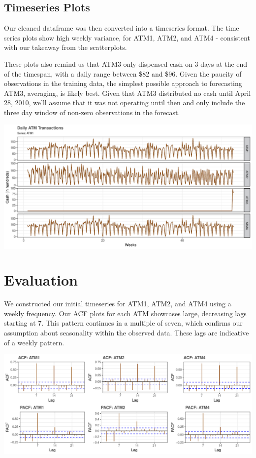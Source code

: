\documentclass[openany]{book}
\begin{document}
\hypertarget{timeseries-plots}{%
\subsection{Timeseries Plots}\label{timeseries-plots}}

Our cleaned dataframe was then converted into a timeseries format. The
time series plots show high weekly variance, for ATM1, ATM2, and ATM4 -
consistent with our takeaway from the scatterplots.

These plots also remind us that ATM3 only dispensed cash on 3 days at
the end of the timespan, with a daily range between \$82 and \$96. Given
the paucity of observations in the training data, the simplest possible
approach to forecasting ATM3, averaging, is likely best. Given that ATM3
distributed no cash until April 28, 2010, we'll assume that it was not
operating until then and only include the three day window of non-zero
observations in the forecast.

\includegraphics{Group2_Project1_Fall2019_files/figure-latex/unnamed-chunk-4-1.pdf}

\hypertarget{evaluation}{%
\section{Evaluation}\label{evaluation}}

We constructed our initial timeseries for ATM1, ATM2, and ATM4 using a
weekly frequency. Our ACF plots for each ATM showcases large, decreasing
lags starting at 7. This pattern continues in a multiple of seven, which
confirms our assumption about seasonality within the observed data.
These lags are indicative of a weekly pattern. \newline

\includegraphics{Group2_Project1_Fall2019_files/figure-latex/unnamed-chunk-5-1.pdf}
\end{document}
